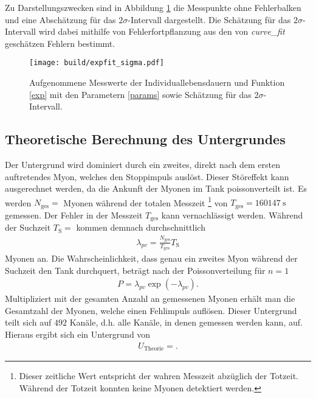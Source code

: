 Zu Darstellungszwecken sind in Abbildung \ref{plot:punkte_sigma} die Messpunkte ohne Fehlerbalken und eine Abschätzung für das $2\sigma$-Intervall dargestellt.
Die Schätzung für das $2\sigma$-Intervall wird dabei mithilfe von Fehlerfortpflanzung aus den von \emph{curve\_fit} geschätzen Fehlern bestimmt.

\begin{figure}
  \centering
  \texttt{[image: build/expfit\_sigma.pdf]}
  \caption{Aufgenommene Messwerte der Individuallebensdauern und Funktion \eqref{exp} mit den Parametern \eqref{params} sowie Schätzung für das $2\sigma$-Intervall.}
  \label{plot:punkte_sigma}
\end{figure}

\subsection{Theoretische Berechnung des Untergrundes}

Der Untergrund wird dominiert durch ein zweites, direkt nach dem ersten auftretendes Myon, welches den Stoppimpuls auslöst.
Dieser Störeffekt kann ausgerechnet werden, da die Ankunft der Myonen im Tank poissonverteilt ist.
Es werden $N_\text{ges} = $ Myonen während der totalen Messzeit \footnote{Dieser zeitliche Wert entspricht der wahren Messzeit abzüglich der Totzeit. Während der Totzeit konnten keine Myonen detektiert werden.} von $T_\text{ges} = \SI{160147}{\second}$ gemessen.
Der Fehler in der Messzeit $T_\text{ges}$ kann vernachlässigt werden.
Während der Suchzeit $T_\text{S} = $ kommen demnach durchschnittlich
\begin{align*}
  \lambda_{pv} = \frac{N_\text{ges}}{T_\text{ges}} T_\text{S}
\end{align*}
Myonen an.
Die Wahrscheinlichkeit, dass genau ein zweites Myon während der Suchzeit den Tank durchquert, beträgt nach der Poissonverteilung für $n=1$
\begin{align*}
  P = \lambda_{pv} \exp{\left(-\lambda_{pv}\right)}.
\end{align*}
Multipliziert mit der gesamten Anzahl an gemessenen Myonen erhält man die Gesamtzahl der Myonen, welche einen Fehlimpuls auflösen.
Dieser Untergrund teilt sich auf $\num{492}$ Kanäle, d.h. alle Kanäle, in denen gemessen werden kann, auf.
Hieraus ergibt sich ein Untergrund von
\begin{align*}
  U_{\text{Theorie}} = .
\end{align*}
